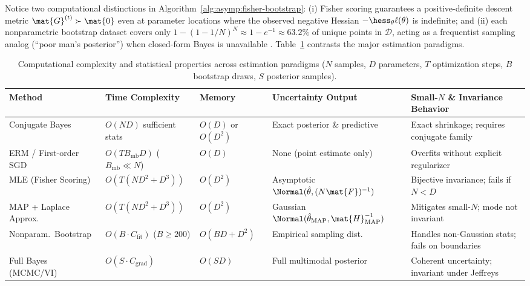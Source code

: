 \documentclass[../../../../master.tex]{subfiles}
\begin{document}
Notice two computational distinctions in Algorithm~\ref{alg:asymp:fisher-bootstrap}: (i) Fisher scoring guarantees a positive-definite descent metric $\mat{G}^{(t)} \succ \mat{0}$ even at parameter locations where the observed negative Hessian $-\hess_\theta\ell(\theta)$ is indefinite; and (ii) each nonparametric bootstrap dataset covers only $1 - (1 - 1/N)^N \approx 1 - e^{-1} \approx 63.2\%$ of unique points in $\mathcal{D}$, acting as a frequentist sampling analog (``poor man's posterior'') when closed-form Bayes is unavailable . Table~\ref{tab:asymp:complexity} contrasts the major estimation paradigms.

\begin{table}[htbp]
\centering
\caption{Computational complexity and statistical properties across estimation paradigms ($N$ samples, $D$ parameters, $T$ optimization steps, $B$ bootstrap draws, $S$ posterior samples).}
\label{tab:asymp:complexity}
\begingroup
\small
\renewcommand{\arraystretch}{1.24}
\begin{tabularx}{\textwidth}{@{}>{\raggedright\arraybackslash}p{2.9cm} >{\raggedright\arraybackslash}p{2.7cm} >{\raggedright\arraybackslash}p{2.2cm} >{\raggedright\arraybackslash}p{3.1cm} >{\raggedright\arraybackslash}X@{}}
\toprule
\textbf{Method} & \textbf{Time Complexity} & \textbf{Memory} & \textbf{Uncertainty Output} & \textbf{Small-$N$ \& Invariance Behavior} \\
\midrule
Conjugate Bayes &
$O(ND)$ sufficient stats &
$O(D)$ or $O(D^2)$ &
Exact posterior \& predictive &
Exact shrinkage; requires conjugate family \\
ERM / First-order SGD &
$O(T B_{\mathrm{mb}} D)$ ($B_{\mathrm{mb}}\!\ll\! N$) &
$O(D)$ &
None (point estimate only) &
Overfits without explicit regularizer \\
MLE (Fisher Scoring) &
$O(T(ND^2 + D^3))$ &
$O(D^2)$ &
Asymptotic $\Normal(\hat{\theta}, (N\mat{F})^{-1})$ &
Bijective invariance; fails if $N < D$ \\
MAP + Laplace Approx. &
$O(T(ND^2 + D^3))$ &
$O(D^2)$ &
Gaussian $\Normal(\hat{\theta}_{\mathrm{MAP}}, \mat{H}_{\mathrm{MAP}}^{-1})$ &
Mitigates small-$N$; mode not invariant \\
Nonparam.\ Bootstrap &
$O(B \cdot C_{\mathrm{fit}})$ ($B \ge 200$) &
$O(BD + D^2)$ &
Empirical sampling dist. &
Handles non-Gaussian stats; fails on boundaries \\
Full Bayes (MCMC/VI) &
$O(S \cdot C_{\mathrm{grad}})$ &
$O(SD)$ &
Full multimodal posterior &
Coherent uncertainty; invariant under Jeffreys \\
\bottomrule
\end{tabularx}
\endgroup
\end{table}
\end{document}
